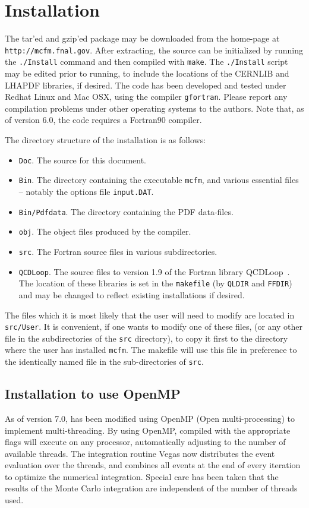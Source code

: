 \documentclass[12pt]{article}
\begin{document}
\section{Installation}

The tar'ed and gzip'ed package may be downloaded from
the \MCFM home-page at {\tt http://mcfm.fnal.gov}.
After extracting, the source can be initialized by running the
{\tt ./Install} command and then compiled with {\tt make}. The
{\tt ./Install} script may be edited prior to running, to include
the locations of the CERNLIB and LHAPDF libraries, if desired.
The code has been developed and tested under Redhat Linux and Mac OSX,
using the compiler {\tt gfortran}. Please report
any compilation problems under other operating systems to the authors.
Note that, as of version 6.0, the code requires a Fortran90 compiler.

The directory structure of the installation is as follows:
\begin{itemize}
\item {\tt Doc}. The source for this document.
\item {\tt Bin}. The directory containing the executable {\tt mcfm},
and various essential files -- notably the options file {\tt input.DAT}.
\item {\tt Bin/Pdfdata}. The directory containing the PDF data-files.
\item {\tt obj}. The object files produced by the compiler. 
\item {\tt src}. The Fortran source files in various subdirectories.
\item {\tt QCDLoop}. The source files to version 1.9 of the Fortran
library QCDLoop~\cite{Ellis:2007qk}. The location of these libraries
is set in the {\tt makefile} (by {\tt QLDIR} and {\tt FFDIR}) and may be
changed to reflect existing installations if desired. 
\end{itemize}
The files which it is most likely that the user will need to modify
are located in {\tt src/User}. It is convenient, if one wants to 
modify one of these files, (or any other file in the subdirectories of the 
{\tt src} directory),
to copy it first to the directory where the user has installed {\tt mcfm}.
The makefile will use this file in preference to the identically named
file in the sub-directories of {\tt src}.
 
\subsection{Installation to use OpenMP}
As of version 7.0, \MCFM has been modified 
using OpenMP (Open multi-processing)  to implement multi-threading. 
By using OpenMP, \MCFM compiled with the appropriate flags
will execute on any processor, 
automatically adjusting to the number of available threads.
The integration routine Vegas now distributes the event evaluation over the threads, 
and combines all events at the end of every iteration to
optimize the numerical integration.
Special care has been taken that the results of the
Monte Carlo integration are independent of the 
number of threads used.
\end{document}
